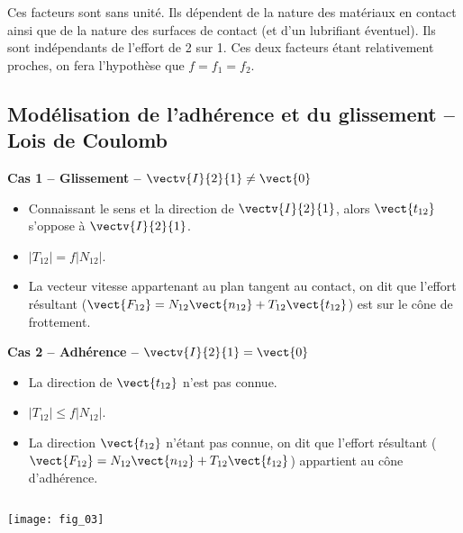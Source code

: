 Ces facteurs sont sans unité. Ils dépendent de la nature des matériaux en contact ainsi que de la nature des surfaces de contact (et d'un lubrifiant éventuel). Ils sont indépendants de l'effort de 2 sur 1. Ces deux facteurs étant relativement proches, on fera l'hypothèse que $f=f_1=f_2$. 

\subsection{Modélisation de l'adhérence et du glissement -- Lois de Coulomb}

\noindent\begin{minipage}[t]{.35\linewidth}
\begin{center}
\textbf{Cas 1 -- Glissement -- $\vectv{I}{2}{1}\neq \vect{0}$}
\end{center}

\begin{itemize}
\item Connaissant le sens et la direction de $\vectv{I}{2}{1}$, alors $\vect{t_{12}}$ s'oppose à $\vectv{I}{2}{1}$.
\item $|T_{12}| = f |N_{12}|$.
\item La vecteur vitesse appartenant au plan tangent au contact, on dit que l'effort résultant ($\vect{F_{12}}=N_{12} \vect{n_{12}}+T_{12} \vect{t_{12}}$) est sur le cône de frottement. 
\end{itemize}
\end{minipage}\hfill
\begin{minipage}[t]{.35\linewidth}
\begin{center}
\textbf{Cas 2 -- Adhérence -- $\vectv{I}{2}{1} = \vect{0}$}
\end{center}

\begin{itemize}
\item La direction de $\vect{t_{12}}$ n'est pas connue. 
\item $|T_{12}| \leq f |N_{12}|$.
\item La direction $\vect{t_{12}}$ n'étant pas connue, on dit que l'effort résultant ($\vect{F_{12}}=N_{12} \vect{n_{12}}+T_{12} \vect{t_{12}}$) appartient au cône d'adhérence. 
\end{itemize}
\end{minipage}\hfill
\begin{minipage}[t]{.29\linewidth}
$\quad$
\begin{center}
\texttt{[image: fig\_03]}
\end{center}
\end{minipage}

